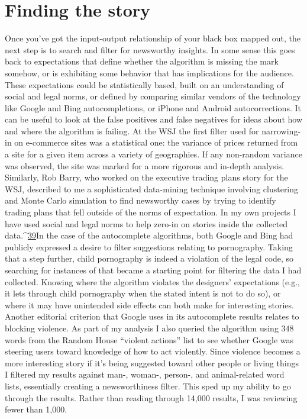 \section{Finding the story }
Once you've got the input-output relationship of your black box mapped out, the next step is to search and filter for newsworthy insights. In some sense this goes back to expectations that define whether the algorithm is missing the mark somehow, or is exhibiting some behavior that has implications for the audience. These expectations could be statistically based, built on an understanding of social and legal norms, or defined by comparing similar vendors of the technology like Google and Bing autocompletions, or iPhone and Android autocorrections. It can be useful to look at the false positives and false negatives for ideas about how and where the algorithm is failing. 
At the WSJ the first filter used for narrowing-in on e-commerce sites was a statistical one: the variance of prices returned from a site for a given item across a variety of geographies. If any non-random variance was observed, the site was marked for a more rigorous and in-depth analysis. Similarly, Rob Barry, who worked on the executive trading plans story for the WSJ, described to me a sophisticated data-mining technique involving clustering and Monte Carlo simulation to find newsworthy cases by trying to identify trading plans that fell outside of the norms of expectation. 
In my own projects I have used social and legal norms to help zero-in on stories inside the collected data.^{\href{#endnotes}{39}}In the case of the autocomplete algorithms, both Google and Bing had publicly expressed a desire to filter suggestions relating to pornography. Taking that a step further, child pornography is indeed a violation of the legal code, so searching for instances of that became a starting point for filtering the data I had collected. Knowing where the algorithm violates the designers' expectations (e.g., it lets through child pornography when the stated intent is not to do so), or where it may have unintended side effects can both make for interesting stories. 
Another editorial criterion that Google uses in its autocomplete results relates to blocking violence. As part of my analysis I also queried the algorithm using 348 words from the Random House ``violent actions'' list to see whether Google was steering users toward knowledge of how to act violently. Since violence becomes a more interesting story if it's being suggested toward other people or living things I filtered my results against man-, woman-, person-, and animal-related word lists, essentially creating a newsworthiness filter. This sped up my ability to go through the results. Rather than reading through 14,000 results, I was reviewing fewer than 1,000. 
